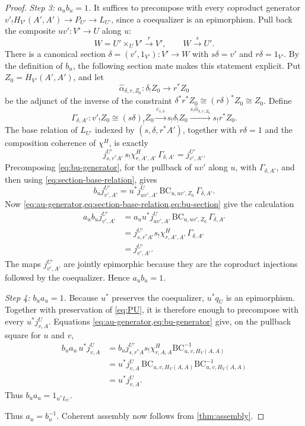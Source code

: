 \begin{proof}
\emph{Step 3: \(a_ub_u=1\).}
It suffices to precompose with every coproduct generator
\(v'_!H_{V'}(A',A')\to P_{U'}\to L_{U'}\), since a coequalizer is an
epimorphism.  Pull back the composite \(uv':V'\to U\) along \(u\):
\[
  W=U'\times_UV'
  \xrightarrow{r}V',
  \qquad
  W\xrightarrow{s}U'.
\]
There is a canonical section
\(\delta=(v',1_{V'}):V'\to W\) with
\(s\delta=v'\) and \(r\delta=1_{V'}\).  By the definition of \(b_u\), the
following section mate makes this statement explicit.  Put
\(Z_0=H_{V'}(A',A')\), and let
\[
  \widehat\alpha_{\delta,r,Z_0}:\delta_!Z_0\longrightarrow r^*Z_0
\]
be the adjunct of the inverse of the constraint
\(\delta^*r^*Z_0\cong(r\delta)^*Z_0\cong Z_0\).  Define
\begin{equation}
  \Gamma_{\delta,A'}:
  v'_!Z_0\cong(s\delta)_!Z_0
  \xrightarrow{c_{s,\delta}}s_!\delta_!Z_0
  \xrightarrow{s_!\widehat\alpha_{\delta,r,Z_0}}s_!r^*Z_0.
  \label{eq:section-mate}
\end{equation}
The base relation of \(L_{U'}\) indexed by
\((s,\delta,r^*A')\), together with \(r\delta=1\) and the composition
coherence of \(\chi^H\), is exactly
\begin{equation}
  j^{U'}_{s,r^*A'}\,s_!\chi^H_{r,A',A'}\,\Gamma_{\delta,A'}
  =j^{U'}_{v',A'}.
  \label{eq:section-base-relation}
\end{equation}
Precomposing \cref{eq:bu-generator}, for the pullback of \(uv'\) along
\(u\), with \(\Gamma_{\delta,A'}\), and then using
\cref{eq:section-base-relation}, gives
\begin{equation}
  b_u j^{U'}_{v',A'}
  =
  u^*j^U_{uv',A'}\,
  \mathrm{BC}_{u,uv',Z_0}\,
  \Gamma_{\delta,A'}.
  \label{eq:bu-section}
\end{equation}
Now \cref{eq:au-generator,eq:section-base-relation,eq:bu-section} give the
calculation
\[
\begin{split}
  a_ub_u j^{U'}_{v',A'}
  &=
  a_u u^*j^U_{uv',A'}\,
  \mathrm{BC}_{u,uv',Z_0}\,\Gamma_{\delta,A'}\\
  &=
  j^{U'}_{s,r^*A'}s_!\chi^H_{r,A',A'}\,
  \Gamma_{\delta,A'}\\
  &=j^{U'}_{v',A'}.
\end{split}
\]
The maps \(j^{U'}_{v',A'}\) are jointly epimorphic because they are the
coproduct injections followed by the coequalizer.  Hence \(a_ub_u=1\).

\emph{Step 4: \(b_ua_u=1\).}
Because \(u^*\) preserves the coequalizer, \(u^*q_U\) is an epimorphism.
Together with preservation of \cref{eq:PU}, it is therefore enough to
precompose with every \(u^*j^U_{v,A}\).  Equations
\cref{eq:au-generator,eq:bu-generator} give, on the pullback square for
\(u\) and \(v\),
\[
\begin{split}
  b_ua_u\,u^*j^U_{v,A}
  &=
  b_u j^{U'}_{s,r^*A}s_!\chi^H_{r,A,A}
       \mathrm{BC}_{u,v,H_V(A,A)}^{-1}\\
  &=
  u^*j^U_{v,A}\,
       \mathrm{BC}_{u,v,H_V(A,A)}
       \mathrm{BC}_{u,v,H_V(A,A)}^{-1}\\
  &=u^*j^U_{v,A}.
\end{split}
\]
Thus \(b_ua_u=1_{u^*L_U}\).

Thus \(a_u=b_u^{-1}\).  Coherent assembly now follows from
\cref{thm:assembly}.
\end{proof}

